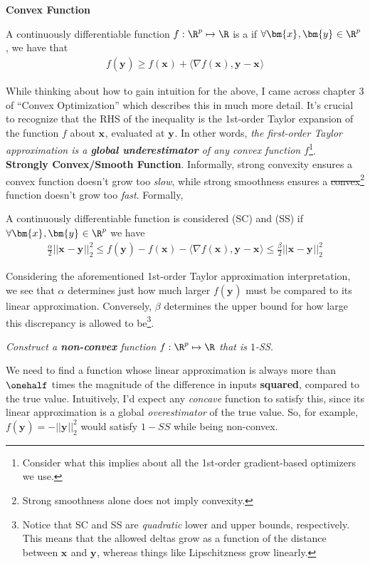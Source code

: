 \documentclass[11pt]{article}
\renewcommand\vec[2][]{\bm{#2}_{#1}}
\begin{document}
\textbf{Convex Function}
\begin{definition}[-1em]
	A continuously differentiable function $f : \R^p \mapsto \R$ is a  if $\forall \vec x, \vec y \in \R^p$, we have that
	\begin{align}
		f(\vec y) \ge f(\vec x) + \langle \nabla f(\vec x), \vec y - \vec x \rangle 
	\end{align}
\end{definition}
While thinking about how to gain intuition for the above, I came across chapter 3 of ``Convex Optimization'' which describes this in much more detail. It's crucial to recognize that the RHS of the inequality is the 1st-order Taylor expansion of the function $f$ about $\vec x$, evaluated at $\vec y$. In other words, \textit{the first-order Taylor approximation is a \textbf{global underestimator} of any convex function $f$}\footnote{Consider what this implies about all the 1st-order gradient-based optimizers we use.}. \\

\textbf{Strongly Convex/Smooth Function}. Informally, strong convexity ensures a convex function doesn't grow too \textit{slow}, while strong smoothness ensures a \sout{convex}\footnote{Strong smoothness alone does not imply convexity.} function doesn't grow too \textit{fast}. Formally,
\begin{definition}[-1em]
	A continuously differentiable function is considered  (SC) and  (SS) if $\forall \vec x, \vec y \in \R^p$ we have
	\begin{align}
		\frac{\alpha}{2} || \vec x - \vec y ||_2^2
		\le
		f(\vec y) - f(\vec x) -  \langle \nabla f(\vec x), \vec y - \vec x \rangle 
		\le 
		\frac{\beta}{2} || \vec x - \vec y ||_2^2
	\end{align}
\end{definition}
Considering the aforementioned 1st-order Taylor approximation interpretation, we see that $\alpha$ determines just how much larger $f(\vec y)$ must be compared to its linear approximation. Conversely, $\beta$ determines the upper bound for how large this discrepancy is allowed to be\footnote{Notice that SC and SS are \textit{quadratic} lower and upper bounds, respectively. This means that the allowed deltas grow as a function of the distance between $\vec x$ and $\vec y$, whereas things like Lipschitzness grow linearly.}. 

\begin{example}
	\textit{Construct a \textbf{non-convex} function $f : \R^p \mapsto \R$ that is $1$-SS.}
	\tcblower 
	
	We need to find a function whose linear approximation is always more than $\onehalf$ times the magnitude of the difference in inputs \textbf{squared}, compared to the true value. Intuitively, I'd expect any \textit{concave} function to satisfy this, since its linear approximation is a global \textit{overestimator} of the true value. So, for example, $f(\vec y) = - || \vec y ||_2^2$ would satisfy $1-SS$ while being non-convex.
\end{example}
\end{document}
